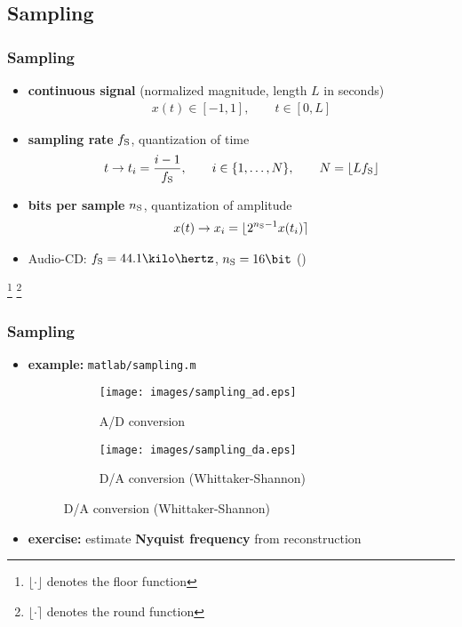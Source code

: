 
\subsection{Sampling}

\begin{frame}
	\frametitle{Sampling}
	\begin{itemize}
		\item \textbf{continuous signal} (normalized magnitude, length $L$ in seconds)
			\begin{align*}
				x(t)\in[-1,1],\qquad t\in[0,L]
			\end{align*}
		\item \textbf{sampling rate} $f_{\textrm S}$, quantization of time
			\begin{align*}
				t\rightarrow t_i=\frac{i-1}{f_{\textrm S}},\qquad i\in\{1,\ldots,N\},\qquad N=\lfloor Lf_{\textrm S}\rfloor
			\end{align*}
		\item \textbf{bits per sample} $n_{\textrm S}$, quantization of amplitude
			\begin{align*}
				x(t)\rightarrow x_i=\lfloor2^{n_{\textrm S}-1}x(t_i)\rceil
			\end{align*}
		\item Audio-CD: $f_{\textrm S}=44.1\kilo\hertz$, $n_{\textrm S}=16\bit$ ()
	\end{itemize}
	{\let\thefootnote\relax\footnote{$\lfloor\cdot\rfloor$ denotes the floor function}}
	{\let\thefootnote\relax\footnote{$\lfloor\cdot\rceil$ denotes the round function}}
\end{frame}

\begin{frame}
	\frametitle{Sampling}
	\begin{itemize}
		\item \textbf{example:} \texttt{matlab/sampling.m}
			\begin{figure}
				\centering
				\begin{subfigure}[t]{0.45\linewidth}
					\texttt{[image: images/sampling\_ad.eps]}
					\caption{A/D conversion}
				\end{subfigure}
				\begin{subfigure}[t]{0.45\linewidth}
					\texttt{[image: images/sampling\_da.eps]}
					\caption{D/A conversion (Whittaker-Shannon)}
				\end{subfigure}
			\end{figure}
		\item \textbf{exercise:} estimate \textbf{Nyquist frequency} from reconstruction
	\end{itemize}
\end{frame}

